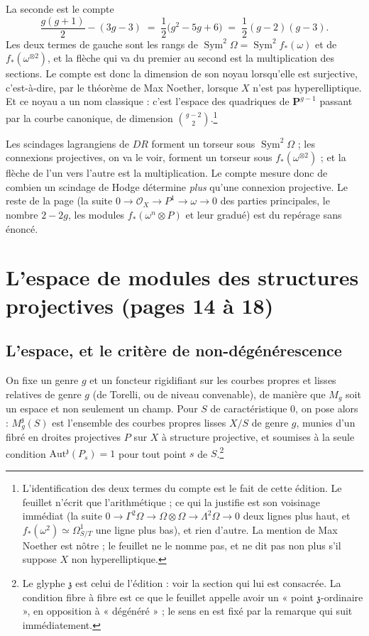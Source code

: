 \documentclass[11pt,a4paper]{article}
\begin{document}
La seconde est le compte
\[
  \frac{g(g+1)}{2} - (3g-3) \;=\; \frac{1}{2}\big(g^2 - 5g + 6\big)
  \;=\; \frac{1}{2}(g-2)(g-3) .
\]
Les deux termes de gauche sont les rangs de
$\operatorname{Sym}^2 \Omega = \operatorname{Sym}^2 f_*(\omega)$ et de
$f_*(\omega^{\otimes 2})$, et la flèche qui va du premier au second est la
multiplication des sections. Le compte est donc la dimension de son noyau
lorsqu'elle est surjective, c'est-à-dire, par le théorème de Max Noether,
lorsque $X$ n'est pas hyperelliptique. Et ce noyau a un nom classique : c'est
l'espace des quadriques de $\mathbf{P}^{g-1}$ passant par la courbe
canonique, de dimension $\binom{g-2}{2}$.\footnote{L'identification des deux
termes du compte est le fait de cette édition. Le feuillet n'écrit que
l'arithmétique ; ce qui la justifie est son voisinage immédiat (la suite
$0 \to \Gamma^2\Omega \to \Omega\otimes\Omega \to \Lambda^2\Omega \to 0$ deux
lignes plus haut, et $f_*(\omega^2) \simeq \Omega^1_{S/T}$ une ligne plus
bas), et rien d'autre. La mention de Max Noether est nôtre ; le feuillet ne le
nomme pas, et ne dit pas non plus s'il suppose $X$ non hyperelliptique.}

Les scindages lagrangiens
de $DR$ forment un torseur sous $\operatorname{Sym}^2\Omega$ ; les connexions
projectives, on va le voir, forment un torseur sous
$f_*(\omega^{\otimes 2})$ ; et la flèche de l'un vers l'autre est la
multiplication. Le compte mesure donc de combien un scindage de
Hodge détermine \emph{plus} qu'une connexion projective. Le reste de la
page (la suite $0 \to \mathcal{O}_X \to P^1 \to \omega \to 0$ des parties
principales, le nombre $2-2g$, les modules $f_*(\omega^n \otimes P)$ et leur
gradué) est du repérage sans énoncé.

\section*{L'espace de modules des structures projectives (pages 14 à 18)}

\subsection*{L'espace, et le critère de non-dégénérescence}

On fixe un genre $g$ et un foncteur rigidifiant sur les courbes propres et
lisses relatives de genre $g$ (de Torelli, ou de niveau convenable), de
manière que $M_g$ soit un espace et non seulement un champ. Pour $S$ de
caractéristique $0$, on pose alors : $M_g^{\mathfrak{z}}(S)$ est l'ensemble
des courbes propres lisses $X/S$ de genre $g$, munies d'un fibré en droites
projectives $P$ sur $X$ à structure projective, et soumises à la seule
condition $\mathrm{Aut}^{\mathfrak{z}}(P_s) = 1$ pour tout point $s$ de
$S$.\footnote{Le glyphe $\mathfrak{z}$ est
celui de l'édition : voir la section qui lui est consacrée. La condition
fibre à fibre est ce que le feuillet appelle avoir un « point
$\mathfrak{z}$-ordinaire », en opposition à « dégénéré » ; le sens en est
fixé par la remarque qui suit immédiatement.}
\end{document}
